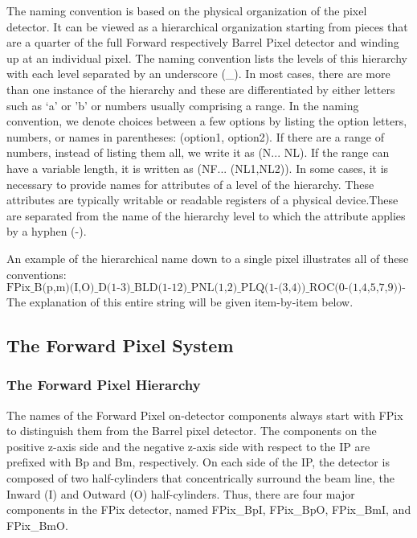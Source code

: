 \documentclass{cmspaper}
\begin{document}
The naming convention is based on the physical organization of the
pixel detector. It can be viewed as a hierarchical organization starting
from pieces that are a quarter of the full Forward respectively Barrel Pixel detector and winding up at an
individual pixel. The naming convention lists the levels of
this hierarchy with each level separated by an underscore (\_). 
In most cases, there are more than one instance of the hierarchy and
these are differentiated by either letters such as `a' or 'b' or numbers
usually comprising a range. In the naming convention, we denote
choices between a few options by listing the option letters, numbers,
or names in parentheses: (option1, option2). If there are a range of numbers,
instead of listing them all, we write it as (N... NL).
If the range can have a variable length, it is written as
(NF... (NL1,NL2)). 
In some cases, it is necessary to provide names for attributes of a level of 
the hierarchy. These attributes are typically writable or readable registers
of a physical device.These are separated from the name of the hierarchy level 
to which the attribute applies by a hyphen (-). 

An example of  the hierarchical name down
to a single pixel illustrates all of these conventions:
\begin{displaymath}
\mbox{FPix\_B(p,m)(I,O)\_D(1-3)\_BLD(1-12)\_PNL(1,2)\_PLQ(1-(3,4))\_
ROC(0-(1,4,5,7,9))-DACNAME}
\end{displaymath}
The explanation of this entire string will be given item-by-item below.


\subsection{The Forward Pixel System}

\subsubsection{The Forward Pixel Hierarchy}

The names of the Forward Pixel on-detector components always start with 
FPix to distinguish  them from the Barrel pixel detector. The components on
the positive z-axis side  and the negative z-axis side 
with respect to the IP are prefixed with Bp 
and Bm, respectively. 
On each side of the IP, the detector is composed of two half-cylinders
that concentrically surround the beam line, 
the Inward (I) and Outward (O) half-cylinders.
Thus, there are four major components in the FPix detector,
named FPix\_BpI, FPix\_BpO, FPix\_BmI, and FPix\_BmO. 
\end{document}
